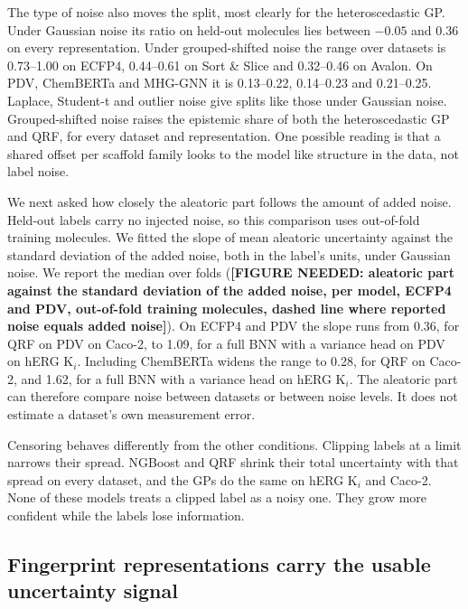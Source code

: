 The type of noise also moves the split, most clearly for the heteroscedastic GP. Under Gaussian noise its ratio on held-out molecules lies between $-0.05$ and 0.36 on every representation. Under grouped-shifted noise the range over datasets is 0.73--1.00 on ECFP4, 0.44--0.61 on Sort \& Slice and 0.32--0.46 on Avalon. On PDV, ChemBERTa and MHG-GNN it is 0.13--0.22, 0.14--0.23 and 0.21--0.25. Laplace, Student-t and outlier noise give splits like those under Gaussian noise. Grouped-shifted noise raises the epistemic share of both the heteroscedastic GP and QRF, for every dataset and representation. One possible reading is that a shared offset per scaffold family looks to the model like structure in the data, not label noise.

We next asked how closely the aleatoric part follows the amount of added noise. Held-out labels carry no injected noise, so this comparison uses out-of-fold training molecules. We fitted the slope of mean aleatoric uncertainty against the standard deviation of the added noise, both in the label's units, under Gaussian noise. We report the median over folds (\textbf{[FIGURE NEEDED: aleatoric part against the standard deviation of the added noise, per model, ECFP4 and PDV, out-of-fold training molecules, dashed line where reported noise equals added noise]}). On ECFP4 and PDV the slope runs from 0.36, for QRF on PDV on Caco-2, to 1.09, for a full BNN with a variance head on PDV on hERG K$_i$. Including ChemBERTa widens the range to 0.28, for QRF on Caco-2, and 1.62, for a full BNN with a variance head on hERG K$_i$. The aleatoric part can therefore compare noise between datasets or between noise levels. It does not estimate a dataset's own measurement error.

Censoring behaves differently from the other conditions. Clipping labels at a limit narrows their spread. NGBoost and QRF shrink their total uncertainty with that spread on every dataset, and the GPs do the same on hERG K$_i$ and Caco-2. None of these models treats a clipped label as a noisy one. They grow more confident while the labels lose information.


\subsection{Fingerprint representations carry the usable uncertainty signal}

